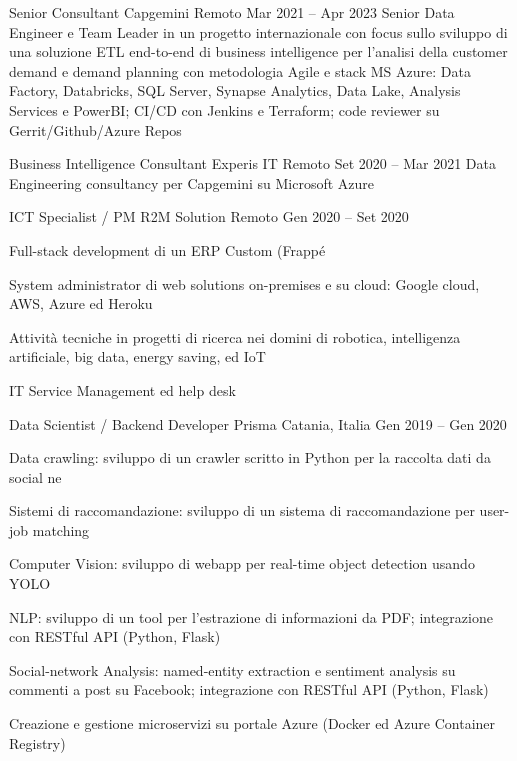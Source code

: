 \begin{cventries}
    \cventry
    {Senior Consultant}
    {Capgemini}
    {Remoto}
    {Mar 2021 -- Apr 2023}
    {Senior Data Engineer e Team Leader in un progetto internazionale con focus sullo sviluppo di una soluzione ETL end-to-end di business intelligence per l'analisi della customer demand e demand planning con metodologia Agile e stack MS Azure: Data Factory, Databricks, SQL Server, Synapse Analytics, Data Lake, Analysis Services e PowerBI; CI/CD con Jenkins e Terraform; code reviewer su Gerrit/Github/Azure Repos}

    \cventry
    {Business Intelligence Consultant}
    {Experis IT}
    {Remoto}
    {Set 2020 -- Mar 2021}
    {Data Engineering consultancy per Capgemini su Microsoft Azure}

    \cventry
    {ICT Specialist / PM}
    {R2M Solution}
    {Remoto}
    {Gen 2020 -- Set 2020}
    {
      \begin{cvitems}
        \item {Full-stack development di un ERP Custom (Frappé}
        \item {System administrator di web solutions on-premises e su cloud: Google cloud, AWS, Azure ed Heroku}
        \item {Attività tecniche in progetti di ricerca nei domini di robotica, intelligenza artificiale, big data, energy saving, ed IoT}
        \item {IT Service Management ed help desk}
      \end{cvitems}
    }

    \cventry
    {Data Scientist / Backend Developer}
    {Prisma}
    {Catania, Italia}
    {Gen 2019 -- Gen 2020}
    {
      \begin{cvitems}
        \item {Data crawling: sviluppo di un crawler scritto in Python per la raccolta dati da social ne}
        \item {Sistemi di raccomandazione: sviluppo di un sistema di raccomandazione per user-job matching}
        \item {Computer Vision: sviluppo di webapp per real-time object detection usando YOLO}
        \item {NLP: sviluppo di un tool per l'estrazione di informazioni da PDF; integrazione con RESTful API (Python, Flask)}
        \item {Social-network Analysis: named-entity extraction e sentiment analysis su commenti a post su Facebook; integrazione con RESTful API (Python, Flask)}
        \item {Creazione e gestione microservizi su portale Azure (Docker ed Azure Container Registry)}
      \end{cvitems}
    }


\end{cventries}
